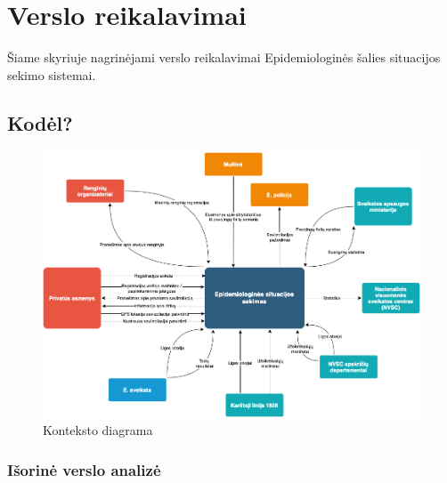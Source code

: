 \documentclass{VUMIFPSkursinis}
\begin{document}
\section{Verslo reikalavimai}
Šiame skyriuje nagrinėjami verslo reikalavimai Epidemiologinės šalies situacijos sekimo sistemai.
\subsection{Kodėl?}

\begin{figure}[H]
	\centering
	\includegraphics[scale=0.5]{img/context_diagram.png}
	\caption{Konteksto diagrama}
	\label{img:context_diagram}
\end{figure}

\subsubsection{Išorinė verslo analizė}
\end{document}
